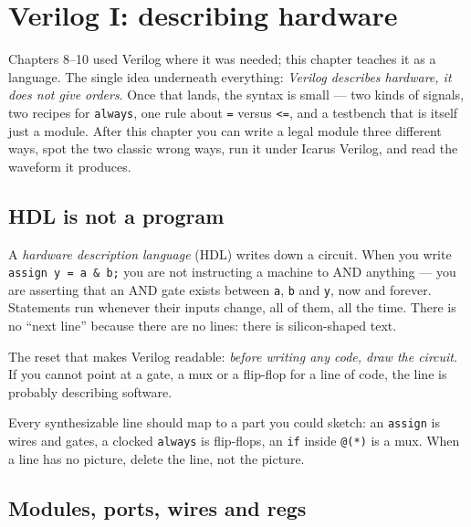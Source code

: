 \chapter{Verilog I: describing hardware}\label{ch:verilog1}

Chapters 8--10 used Verilog where it was needed; this chapter teaches it
as a language. The single idea underneath everything: \emph{Verilog
describes hardware, it does not give orders}. Once that lands, the
syntax is small --- two kinds of signals, two recipes for
\texttt{always}, one rule about \texttt{=} versus \texttt{<=}, and a
testbench that is itself just a module. After this chapter you can write
a legal module three different ways, spot the two classic wrong ways,
run it under Icarus Verilog, and read the waveform it produces.

\section{HDL is not a program}\label{sec:hdlmind}

 A \emph{hardware description language} (HDL)
writes down a circuit. When you write \texttt{assign y = a \& b;} you
are not instructing a machine to AND anything --- you are asserting
that an AND gate exists between \texttt{a}, \texttt{b} and \texttt{y},
now and forever. Statements run whenever their inputs change, all of
them, all the time. There is no ``next line'' because there are no
lines: there is silicon-shaped text.

The reset that makes Verilog readable: \emph{before writing any code,
draw the circuit}. If you cannot point at a gate, a mux or a flip-flop
for a line of code, the line is probably describing software.

\begin{principle}
Every synthesizable line should map to a part you could sketch:
an \texttt{assign} is wires and gates, a clocked \texttt{always} is
flip-flops, an \texttt{if} inside \texttt{@(*)} is a mux. When a line
has no picture, delete the line, not the picture.
\end{principle}

\section{Modules, ports, wires and regs}\label{sec:ports}

